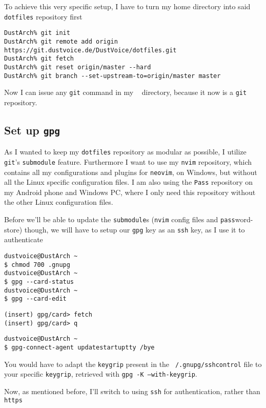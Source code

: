 \documentclass[9pt]{report}
\newenvironment{NOTE}
{\begin{tcolorbox}[colback=admonitionBG,coltitle=draculaFG,colframe=draculaBlue,colbacktitle=draculaBlue,title=NOTE]}
{\end{tcolorbox}}
\begin{document}
To achieve this very specific setup, I have to turn my home directory into said \texttt{dotfiles} repository first


\begin{verbatim}
DustArch% git init
DustArch% git remote add origin https://git.dustvoice.de/DustVoice/dotfiles.git
DustArch% git fetch
DustArch% git reset origin/master --hard
DustArch% git branch --set-upstream-to=origin/master master
\end{verbatim}

Now I can issue any \texttt{git} command in my \texttt{~} directory, because it now is a \texttt{git} repository.



\newpage

\hypertarget{x-set-up-gpg}{\subsection{Set up \texttt{gpg}}}
As I wanted to keep my \texttt{dotfiles} repository as modular as possible, I utilize \texttt{git}'s \texttt{submodule} feature.
Furthermore I want to use my \texttt{nvim} repository, which contains all my configurations and plugins for \texttt{neovim}, on Windows, but without all the Linux specific configuration files.
I am also using the \texttt{Pass} repository on my Android phone and Windows PC, where I only need this repository without the other Linux configuration files.


Before we’ll be able to update the \texttt{submodule}s (\texttt{nvim} config files and \texttt{pass}word-store) though, we will have to setup our \texttt{gpg} key as an \texttt{ssh} key, as I use it to authenticate


\begin{verbatim}
dustvoice@DustArch ~
$ chmod 700 .gnupg
dustvoice@DustArch ~
$ gpg --card-status
dustvoice@DustArch ~
$ gpg --card-edit
\end{verbatim}

\begin{verbatim}
(insert) gpg/card> fetch
(insert) gpg/card> q
\end{verbatim}

\begin{verbatim}
dustvoice@DustArch ~
$ gpg-connect-agent updatestartuptty /bye
\end{verbatim}

\begin{NOTE}
    You would have to adapt the \texttt{keygrip} present in the \texttt{~/.gnupg/sshcontrol} file to your specific \texttt{keygrip}, retrieved with \texttt{gpg -K --with-keygrip}.

\end{NOTE}
Now, as mentioned before, I’ll switch to using \texttt{ssh} for authentication, rather than \texttt{https}
\end{document}
